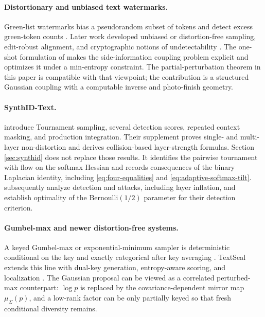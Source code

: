 \documentclass[11pt]{article}
\theoremstyle{definition}
\theoremstyle{remark}
\begin{document}
\paragraph{Distortionary and unbiased text watermarks.}
Green-list watermarks bias a pseudorandom subset of tokens and detect excess green-token counts \citep{kirchenbauer2023watermark}. Later work developed unbiased or distortion-free sampling, edit-robust alignment, and cryptographic notions of undetectability \citep{kuditipudi2024robust,christ2024undetectable,hu2024unbiased}. The one-shot formulation of \citet{tsur2025couplings} makes the side-information coupling problem explicit and optimizes it under a min-entropy constraint. The partial-perturbation theorem in this paper is compatible with that viewpoint; the contribution is a structured Gaussian coupling with a computable inverse and photo-finish geometry.

\paragraph{SynthID-Text.}
\citet{dathathri2024synthid} introduce Tournament sampling, several detection scores, repeated context masking, and production integration. Their supplement proves single- and multi-layer non-distortion and derives collision-based layer-strength formulas. Section \ref{sec:synthid} does not replace those results. It identifies the pairwise tournament with flow on the softmax Hessian and records consequences of the binary Laplacian identity, including \eqref{eq:four-equalities} and \eqref{eq:adaptive-softmax-tilt}. \citet{omidi2026synthid} subsequently analyze detection and attacks, including layer inflation, and establish optimality of the Bernoulli$(1/2)$ parameter for their detection criterion.

\paragraph{Gumbel-max and newer distortion-free systems.}
A keyed Gumbel-max or exponential-minimum sampler is deterministic conditional on the key and exactly categorical after key averaging \citep{kuditipudi2024robust,dathathri2024synthid}. TextSeal extends this line with dual-key generation, entropy-aware scoring, and localization \citep{sander2026textseal}. The Gaussian proposal can be viewed as a correlated perturbed-max counterpart: $\log p$ is replaced by the covariance-dependent mirror map $\mu_\Sigma(p)$, and a low-rank factor can be only partially keyed so that fresh conditional diversity remains.
\end{document}
